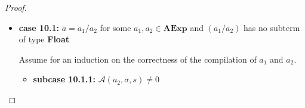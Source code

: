 \documentclass{article}
\begin{document}
\begin{proof}
\begin{itemize}
    \[
      \begin{aligned}
        \langle  \mathcal{CA}(a) : c,\, e,\, \sigma,\, s,\, pc \rangle 
        &= \langle \mathcal{CA}(a_1 - a_2) : c,\, e,\, \sigma,\, s,\, pc \rangle \\
        &= \langle \mathcal{CA}(a_2) : \mathcal{CA}(a_1) : \texttt{SUB} :  c,\, e,\, \sigma,\, s,\, pc \rangle 
        && \text{(definition of $\mathcal{CA}$)} \\
        &\triangleright^{\ast} \langle \mathcal{CA}(a_1) : \texttt{SUB} :  c,\, \mathcal{A}(a_2, \sigma, s) : e,\, \sigma,\, s,\, pc + l_2 \rangle 
        && \text{(induction hypothesis 2)} \\
        &\triangleright^{\ast} \langle \texttt{SUB} :  c,\, \mathcal{A}(a_1, \sigma, s) : \mathcal{A}(a_2, \sigma, s) : e,\, \sigma,\, s,\, pc + l_2 + l_1 \rangle 
        && \text{(induction hypothesis 1)} \\
        &\triangleright \langle c,\, (\mathcal{A}(a_1, \sigma, s) - \mathcal{A}(a_2, \sigma, s)) : e,\, \sigma,\, s,\, pc + l_2 + l_1 + 1 \rangle 
        && \text{(operational semantics)} \\
        &= \langle c,\, \mathcal{A}(a_1 - a_2, \sigma, s) : e,\, \sigma,\, s,\, pc + l_2 + l_1 + 1 \rangle
        && \text{(definition of $\mathcal{A}$)} \\
        &= \langle c,\, \mathcal{A}(a, \sigma, s) : e,\, \sigma,\, s,\, pc + l_2 + l_1 + 1 \rangle \\
      \end{aligned}
  \]

    \item \textbf{case 10.1: } $a = a_1 / a_2$ for some $a_1, a_2 \in \textbf{AExp}$ and $(a_1 / a_2)$ has no subterm of type \textbf{Float}

    Assume for an induction on the correctness of the compilation of $a_1$ and $a_2$.

        \begin{itemize}
            \item \textbf{subcase 10.1.1: } $\mathcal{A}(a_2, \sigma, s) \neq 0$


\end{itemize}
\end{itemize}
\end{proof}
\end{document}
